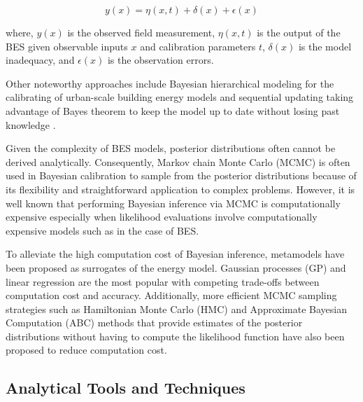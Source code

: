 \documentclass[review]{elsarticle}
\begin{document}
\begin{equation}\label{eq:koh}
y(x) = \eta(x,t) + \delta(x) + \epsilon(x)
\end{equation}

\noindent where, $y(x)$ is the observed field measurement, $\eta(x,t)$ is the output of the BES given observable inputs $x$ and calibration parameters $t$, $\delta(x)$ is the model inadequacy, and $\epsilon(x)$ is the observation errors. 

Other noteworthy approaches include Bayesian hierarchical modeling for the calibrating of urban-scale building energy models \cite{kristensen2018hierarchical, kristensen2020long} and sequential updating taking advantage of Bayes theorem to keep the model up to date without losing past knowledge \cite{chong2019continuous, rouchier2019sequential}.

Given the complexity of BES models, posterior distributions often cannot be derived analytically. Consequently, Markov chain Monte Carlo (MCMC) is often used in Bayesian calibration to sample from the posterior distributions because of its flexibility and straightforward application to complex problems. However, it is well known that performing Bayesian inference via MCMC is computationally expensive especially when likelihood evaluations involve computationally expensive models such as in the case of BES. 

To alleviate the high computation cost of Bayesian inference, metamodels have been proposed as surrogates of the energy model. Gaussian processes (GP) \cite{martinez2019energy, menberg2019influence, chong2018guidelines, lim2017comprehensive, chong2017bayesian, yuan2017simultaneous, kim2016stepwise, chong2019continuous, chen2019district} and linear regression \cite{lim2018influences, sokol2017validation, li2016assessment, tian2016identifying, tardioli2020methodology} are the most popular with competing trade-offs between computation cost and accuracy.  Additionally, more efficient MCMC sampling strategies such as Hamiltonian Monte Carlo (HMC) \cite{chong2017bayesian, lundstrom2019bayesian} and Approximate Bayesian Computation (ABC) methods that provide estimates of the posterior distributions without having to compute the likelihood function \cite{zhu2020uncertainty} have also been proposed to reduce computation cost. 

\subsection{Analytical Tools and Techniques} \label{sec:analytical_tools}
\end{document}

